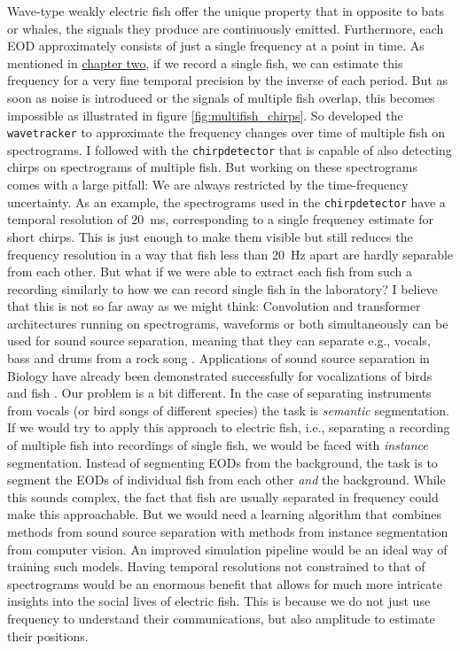 Wave-type weakly electric fish offer the unique property that in opposite to
bats or whales, the signals they produce are continuously emitted. Furthermore,
each EOD approximately consists of just a single frequency at a point in time.
As mentioned in \hyperref[fig:multifish_chirps]{chapter two}, if we record a
single fish, we can estimate this frequency for a very fine temporal precision
by the inverse of each period. But as soon as noise is introduced or the
signals of multiple fish overlap, this becomes impossible as illustrated in
figure \ref{fig:multifish_chirps}. So
\textcite{raabAdvancesNoninvasiveTracking2022,
henningerTrackingActivityPatterns2020} developed the \texttt{wavetracker} to
approximate the frequency changes over time of multiple fish on spectrograms. I
followed with the \texttt{chirpdetector} that is capable of also detecting
chirps on spectrograms of multiple fish. But working on these spectrograms
comes with a large pitfall: We are always restricted by the time-frequency
uncertainty. As an example, the spectrograms used in the \texttt{chirpdetector}
have a temporal resolution of \SI{20}{\milli\second}, corresponding to a single
frequency estimate for short chirps. This is just enough to make them visible
but still reduces the frequency resolution in a way that fish less than
\SI{20}{\hertz} apart are hardly separable from each other. But what if we were
able to extract each fish from such a recording similarly to how we can record
single fish in the laboratory? I believe that this is not so far away as we
might think: Convolution and transformer architectures running on spectrograms,
waveforms or both simultaneously can be used for sound source separation,
meaning that they can separate e.g., vocals, bass and drums from a rock song
\parencite{rouardHybridTransformersMusic2022,
stollerWaveUNetMultiScaleNeural2018, petermannCocktailForkProblem2022}.
Applications of sound source separation in Biology have already been
demonstrated successfully for vocalizations of birds and fish
\parencite{dentonImprovingBirdClassification2022,
mancusiFishSoundsEvaluation2022}. Our problem is a bit different. In the case
of separating instruments from vocals (or bird songs of different species)  the
task is \emph{semantic} segmentation. If we would try to apply this approach to
electric fish, i.e., separating a recording of multiple fish into recordings of
single fish, we would be faced with \emph{instance} segmentation. Instead of
segmenting EODs from the background, the task is to segment the EODs of
individual fish from each other \emph{and} the background. While this sounds
complex, the fact that fish are usually separated in frequency could make this
approachable. But we would need a learning algorithm that combines methods from
sound source separation with methods from instance segmentation from computer
vision. An improved simulation pipeline would be an ideal way of training such
models. Having temporal resolutions not constrained to that of spectrograms
would be an enormous benefit that allows for much more intricate insights into
the social lives of electric fish. This is because we do not just use frequency
to understand their communications, but also amplitude to estimate their
positions.

